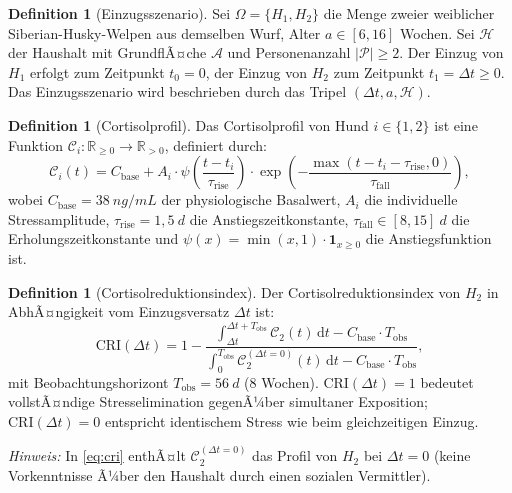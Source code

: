﻿\documentclass[12pt, a4paper]{article}
\theoremstyle{plain}
\theoremstyle{definition}
\newtheorem{definition}[theorem]{Definition}
\theoremstyle{remark}
\newcommand{\CRI}{\mathrm{CRI}}
\newcommand{\R}{\mathbb{R}}
\newcommand{\dt}{\Delta t}
\newcommand{\cort}{\mathcal{C}}
\begin{document}
\begin{definition}[Einzugsszenario]\label{def:einzug}
Sei $\Omega = \{H_1, H_2\}$ die Menge zweier weiblicher Siberian-Husky-Welpen
aus demselben Wurf, Alter $a \in [6, 16]$ Wochen. Sei $\mathcal{H}$ der
Haushalt mit GrundflÃ¤che $\mathcal{A}$ und Personenanzahl $|\mathcal{P}| \geq 2$.
Der Einzug von $H_1$ erfolgt zum Zeitpunkt $t_0 = 0$, der Einzug von $H_2$ zum
Zeitpunkt $t_1 = \dt \geq 0$. Das Einzugsszenario wird beschrieben durch das
Tripel $(\dt, a, \mathcal{H})$.
\end{definition}

\begin{definition}[Cortisolprofil]\label{def:cortisol}
Das Cortisolprofil von Hund $i \in \{1, 2\}$ ist eine Funktion
$\cort_i : \R_{\geq 0} \to \R_{>0}$, definiert durch:
\begin{equation}
  \cort_i(t) = C_{\mathrm{base}} + A_i \cdot \psi\!\left(\frac{t - t_i}{\tau_{\mathrm{rise}}}\right)
               \cdot \exp\!\left(-\frac{\max(t - t_i - \tau_{\mathrm{rise}}, 0)}{\tau_{\mathrm{fall}}}\right),
  \label{eq:cortisol}
\end{equation}
wobei $C_{\mathrm{base}} = 38\ \si{ng/mL}$ der physiologische Basalwert,
$A_i$ die individuelle Stressamplitude, $\tau_{\mathrm{rise}} = 1{,}5\ \si{d}$
die Anstiegszeitkonstante, $\tau_{\mathrm{fall}} \in [8, 15]\ \si{d}$ die
Erholungszeitkonstante und $\psi(x) = \min(x, 1) \cdot \mathbf{1}_{x \geq 0}$
die Anstiegsfunktion ist.
\end{definition}

\begin{definition}[Cortisolreduktionsindex]\label{def:cri}
Der Cortisolreduktionsindex von $H_2$ in AbhÃ¤ngigkeit vom Einzugsversatz $\dt$
ist:
\begin{equation}
  \CRI(\dt) = 1 - \frac{\int_{\dt}^{\dt+T_{\mathrm{obs}}} \cort_2(t)\,\mathrm{d}t -
              C_{\mathrm{base}} \cdot T_{\mathrm{obs}}}%
              {\int_{0}^{T_{\mathrm{obs}}} \cort_2^{(\dt=0)}(t)\,\mathrm{d}t -
              C_{\mathrm{base}} \cdot T_{\mathrm{obs}}},
  \label{eq:cri}
\end{equation}
mit Beobachtungshorizont $T_{\mathrm{obs}} = 56\ \si{d}$ (8 Wochen).
$\CRI(\dt) = 1$ bedeutet vollstÃ¤ndige Stresselimination gegenÃ¼ber simultaner
Exposition; $\CRI(\dt) = 0$ entspricht identischem Stress wie beim
gleichzeitigen Einzug.
\end{definition}

\noindent\textit{Hinweis:} In \cref{eq:cri} enthÃ¤lt $\cort_2^{(\dt=0)}$ das
Profil von $H_2$ bei $\dt = 0$ (keine Vorkenntnisse Ã¼ber den Haushalt durch
einen sozialen Vermittler).
\end{document}
